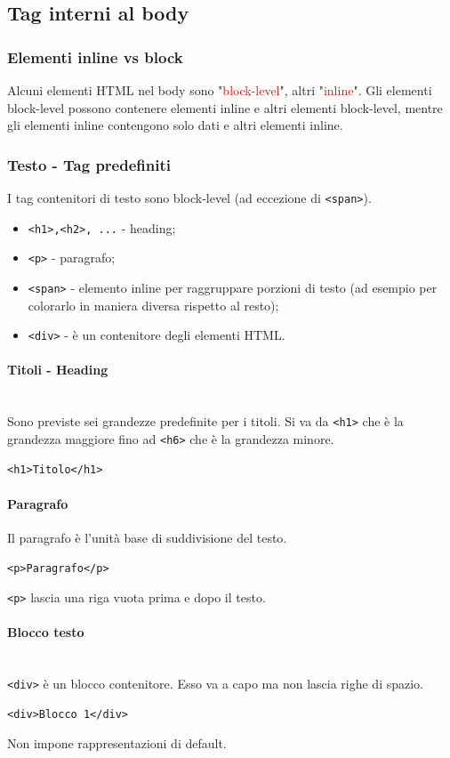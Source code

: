 \documentclass{article}
\begin{document}
\subsection{Tag interni al body}
\subsubsection{Elementi inline vs block}
Alcuni elementi HTML nel body sono "\textcolor{red}{block-level}", altri "\textcolor{red}{inline}". Gli elementi block-level possono contenere elementi inline e altri elementi block-level, mentre gli elementi
inline contengono solo dati e altri elementi inline.
\subsubsection{Testo - Tag predefiniti}
I tag contenitori di testo sono block-level (ad eccezione di \texttt{<span>}).
\begin{itemize}
    \item \texttt{<h1>,<h2>, ...} - heading;
    \item \texttt{<p>} - paragrafo;
    \item \texttt{<span>} - elemento inline per raggruppare porzioni di testo (ad esempio per colorarlo in maniera diversa rispetto al resto);
    \item \texttt{<div>} - è un contenitore degli elementi HTML.
\end{itemize}
\paragraph{Titoli - Heading} \mbox{}\\
Sono previste sei grandezze predefinite per i titoli. Si va da \texttt{<h1>} che è la grandezza maggiore fino ad \texttt{<h6>} che è la grandezza minore.
\begin{lstlisting}[style=htmlstyle]
<h1>Titolo</h1>
\end{lstlisting}
\paragraph{Paragrafo} \mbox{}
Il paragrafo è l'unità base di suddivisione del testo.
\begin{lstlisting}[style=htmlstyle]
<p>Paragrafo</p>
\end{lstlisting}
\texttt{<p>} lascia una riga vuota prima e dopo il testo.
\paragraph{Blocco testo} \mbox{} \\
\texttt{<div>} è un blocco contenitore. Esso va a capo ma non lascia righe di spazio.
\begin{lstlisting}[style=htmlstyle]
<div>Blocco 1</div>
\end{lstlisting}
Non impone rappresentazioni di default.
\end{document}

